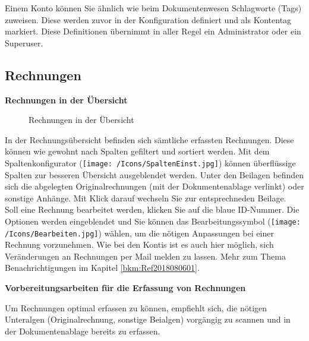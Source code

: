 Einem Konto können Sie ähnlich wie beim Dokumentenwesen Schlagworte (Tags) zuweisen. Diese werden zuvor in der Konfiguration definiert und als Kontentag markiert. Diese Definitionen übernimmt in aller Regel ein Administrator oder ein Superuser.

\pagebreak
\subsection{Rechnungen}

\textbf{Rechnungen in der Übersicht}

\begin{figure}[H]
\caption{Rechnungen in der Übersicht}
\end{figure}

In der Rechnungsübersicht befinden sich sämtliche erfassten Rechnungen. Diese können wie gewohnt nach Spalten gefiltert und sortiert werden. Mit dem Spaltenkonfigurator (\texttt{[image: /Icons/SpaltenEinst.jpg]}) können überflüssige Spalten zur besseren Übersicht ausgeblendet werden. Unter den Beilagen befinden sich die abgelegten Originalrechnungen (mit der Dokumentenablage verlinkt) oder sonstige Anhänge. Mit Klick darauf wechseln Sie zur entsprechneden Beilage.\\
Soll eine Rechnung bearbeitet werden, klicken Sie auf die blaue ID-Nummer. Die Optionen werden eingeblendet und Sie können das Bearbeitungssymbol (\texttt{[image: /Icons/Bearbeiten.jpg]}) wählen, um die nötigen Anpassungen bei einer Rechnung vorzunehmen. Wie bei den Kontis ist es auch hier möglich, sich Veränderungen an Rechnungen per Mail melden zu lassen. Mehr zum Thema Benachrichtigungen im Kapitel \ref{bkm:Ref2018080601}.

\vspace{\baselineskip}

\textbf{Vorbereitungsarbeiten für die Erfassung von Rechnungen}

\vspace{\baselineskip}

Um Rechnungen optimal erfassen zu können, empfiehlt sich, die nötigen Unteralgen (Originalrechnung, sonstige Beialgen) vorgängig zu scannen und in der Dokumentenablage bereits zu erfassen.

